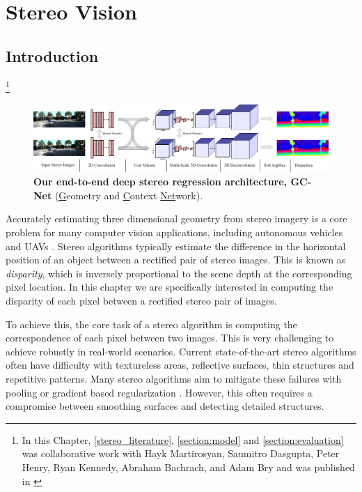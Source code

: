 \chapter{Stereo Vision}
\label{stereo}

\graphicspath{{Chapter4/Figs/}}


\section{Introduction}

{\let\thefootnote\relax\footnote{{In this Chapter, \cref{stereo_literature}, \cref{section:model} and \cref{section:evaluation} was collaborative work with Hayk Martirosyan, Saumitro Dasgupta, Peter Henry, Ryan Kennedy, Abraham Bachrach, and Adam Bry and was published in \citep{kendall2017end}}}}

\begin{figure}[t]
	\begin{center}
		\includegraphics[width=\linewidth]{deep_stereo}
	\end{center}
	\caption[An end-to-end deep learning model for stereo regression.]{\textbf{Our end-to-end deep stereo regression architecture, GC-Net} (\underline{G}eometry and \underline{C}ontext \underline{Net}work).}
	\label{fig:model}
\end{figure}

Accurately estimating three dimensional geometry from stereo imagery is a core problem for many computer vision applications, including autonomous vehicles and UAVs \citep{achtelik2009stereo}. Stereo algorithms typically estimate the difference in the horizontal position of an object between a rectified pair of stereo images. This is known as \textit{disparity}, which is inversely proportional to the scene depth at the corresponding pixel location. In this chapter we are specifically interested in computing the disparity of each pixel between a rectified stereo pair of images. 

To achieve this, the core task of a stereo algorithm is computing the correspondence of each pixel between two images. This is very challenging to achieve robustly in real-world scenarios. Current state-of-the-art stereo algorithms often have difficulty with textureless areas, reflective surfaces, thin structures and repetitive patterns. Many stereo algorithms aim to mitigate these failures with pooling or gradient based regularization \citep{geiger2010efficient,hirschmuller2005accurate}. However, this often requires a compromise between smoothing surfaces and detecting detailed structures.


